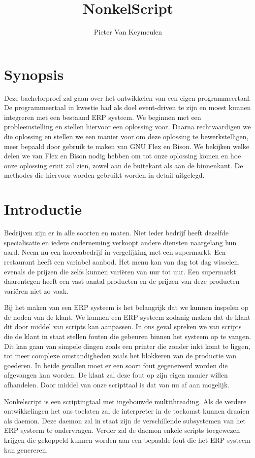\documentclass[11pt,a4paper]{article}
\author{Pieter Van Keymeulen}
\title{NonkelScript}
\begin{document}

\newpage

\tableofcontents
\newpage
\section{Synopsis}
Deze bachelorproef zal gaan over het ontwikkelen van een eigen programmeertaal. De programmeertaal in kwestie had als doel event-driven te zijn en moest kunnen integreren met een bestaand ERP systeem. We beginnen met een probleemstelling en stellen hiervoor een oplossing voor. Daarna rechtvaardigen we die oplossing en stellen we een manier voor om deze oplossing te bewerkstelligen, meer bepaald door gebruik te maken van GNU Flex en Bison. We bekijken welke delen we van Flex en Bison nodig hebben om tot onze oplossing komen en hoe onze oplossing eruit zal zien, zowel aan de buitekant als aan de binnenkant. De methodes die hiervoor worden gebruikt worden in detail uitgelegd.

\section{Introductie}
Bedrijven zijn er in alle soorten en maten. Niet ieder bedrijf heeft dezelfde specialisatie en iedere onderneming verkoopt andere diensten naargelang hun aard. Neem nu een horecabedrijf in vergelijking met een supermarkt. Een restaurant heeft een variabel aanbod. Het menu kan van dag tot dag wisselen, evenals de prijzen die zelfs kunnen variëren van uur tot uur. Een supermarkt daarentegen heeft een vast aantal producten en de prijzen van deze producten variëren niet zo vaak.

Bij het maken van een ERP systeem is het belangrijk dat we kunnen inspelen op de noden van de klant. We kunnen een ERP systeem zodanig maken dat de klant dit door middel van scripts kan aanpassen. In ons geval spreken we van scripts die de klant in staat stellen fouten die gebeuren binnen het systeem op te vangen. Dit kan gaan van simpele dingen zoals een printer die zonder inkt komt te liggen, tot meer complexe omstandigheden zoals het blokkeren van de productie van goederen. In beide gevallen moet er een soort fout gegenereerd worden die afgevangen kan worden. De klant zal deze fout op zijn eigen manier willen afhandelen. Door middel van onze scripttaal is dat van nu af aan mogelijk.

Nonkelscript is een scriptingtaal met ingebouwde multithreading. Als de verdere ontwikkelingen het ons toelaten zal de  interpreter in de toekomst kunnen draaien als daemon. Deze daemon zal in staat zijn de verschillende subsystemen van het ERP systeem te ondervragen. Verder zal de daemon enkele scripts toegewezen krijgen die gekoppeld kunnen worden aan een bepaalde fout die het ERP systeem kan genereren.
\end{document}
